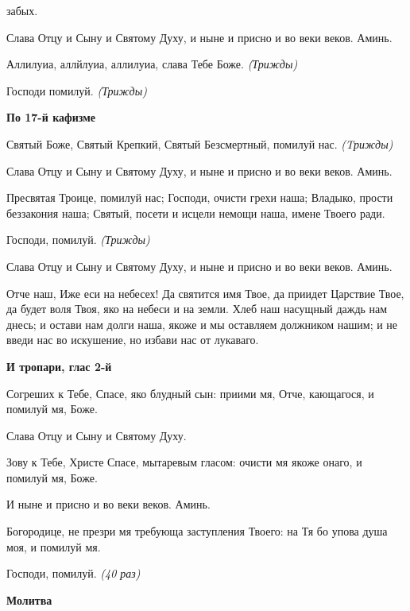 забых.


   Слава Отцу и Сыну и Святому Духу, и ныне и присно и во веки веков.
Аминь.


   Аллилуиа, аллйлуиа, аллилуиа, слава Тебе Боже. \itshape (Трижды)\normalfont{}


   Господи помилуй. \itshape (Трижды)\normalfont{}


 

\bfseries По 17-й кафизме\normalfont{}

   Святый Боже, Святый Крепкий, Святый Безсмертный, помилуй нас. \itshape 
(Tрижды)\normalfont{}


   Слава Отцу и Сыну и Святому Духу, и ныне и присно и во веки веков.
Аминь.


   Пресвятая Троице, помилуй нас; Господи, очисти грехи наша; Владыко,
прости беззакония наша; Святый, посети и исцели немощи наша, имене
Твоего ради.


   Господи, помилуй. \itshape  (Трижды)\normalfont{}


   Слава Отцу и Сыну и Святому Духу, и ныне и присно и во веки веков.
Аминь.


   Отче наш, Иже еси на небесех! Да святится имя Твое, да приидет
Царствие Твое, да будет воля Твоя, яко на небеси и на земли. Хлеб наш
насущный даждь нам днесь; и остави нам долги наша, якоже и мы оставляем
должником нашим; и не введи нас во искушение, но избави нас от
лукаваго.


 

\bfseries И тропари, глас 2-й\normalfont{}

   Согреших к Тебе, Спасе, яко блудный сын: приими мя, Отче, кающагося,
и помилуй мя, Боже.


   Слава Отцу и Сыну и Святому Духу.


   Зову к Тебе, Христе Спасе, мытаревым гласом: очисти мя якоже онаго, и
помилуй мя, Боже.


   И ныне и присно и во веки веков. Аминь.


   Богородице, не презри мя требующа заступления Твоего: на Тя бо упова
душа моя, и помилуй мя.


   Господи, помилуй. \itshape (40 раз)\normalfont{}


 

\bfseries Молитва\normalfont{}

